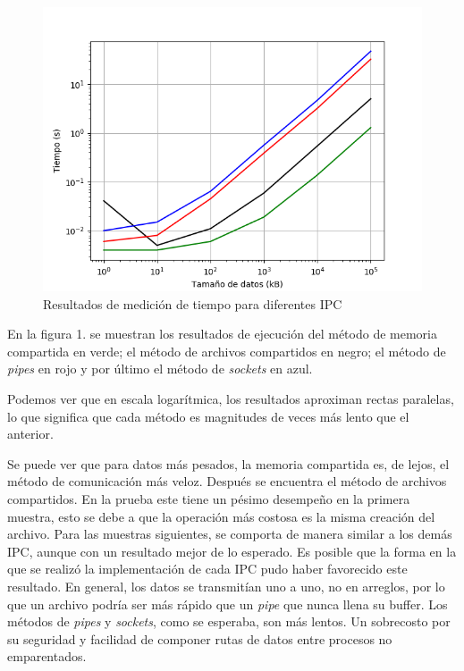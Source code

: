 \begin{figure}
\centering
\includegraphics[scale=0.8]{img/results_graph.png}
\caption{Resultados de medición de tiempo para diferentes
IPC}
\end{figure}

En la figura 1. se muestran los resultados de ejecución del
método de memoria compartida en verde;
el método de archivos compartidos en negro;
el método de \emph{pipes} en rojo y
por último el método de \emph{sockets} en azul.

Podemos ver que en escala logarítmica, los resultados aproximan rectas paralelas,
lo que significa que cada método es magnitudes de veces más lento que el anterior.

Se puede ver que para datos más pesados,
la memoria compartida es, de lejos, el método de comunicación más veloz.
Después se encuentra el método de archivos compartidos.
En la prueba este tiene un pésimo desempeño en la primera muestra,
esto se debe a que la operación más costosa es la misma creación del archivo.
Para las muestras siguientes, se comporta de manera similar a los demás IPC,
aunque con un resultado mejor de lo esperado. Es posible que la forma en la que se realizó
la implementación de cada IPC pudo haber favorecido este resultado.
En general, los datos se transmitían uno a uno, no en arreglos,
por lo que un archivo podría ser más rápido que un \emph{pipe} que nunca llena su buffer.
Los métodos de \emph{pipes} y \emph{sockets}, como se esperaba, son más lentos.
Un sobrecosto por su seguridad y facilidad de componer rutas de datos entre
procesos no emparentados.

